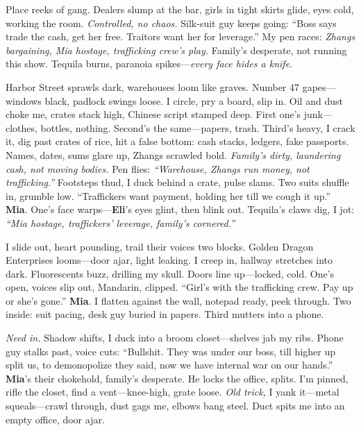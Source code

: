 \documentclass{article}
\begin{document}
Place reeks of gang. Dealers slump at the bar, girls in tight skirts glide, eyes cold, working the room. \textit{Controlled, no chaos.} Silk-suit guy keeps going: “Boss says trade the cash, get her free. Traitors want her for leverage.” My pen races: \textit{Zhangs bargaining, Mia hostage, trafficking crew’s play.} Family’s desperate, not running this show. Tequila burns, paranoia spikes—\textit{every face hides a knife.}

Harbor Street sprawls dark, warehouses loom like graves. Number 47 gapes—windows black, padlock swings loose. I circle, pry a board, slip in. Oil and dust choke me, crates stack high, Chinese script stamped deep. First one’s junk—clothes, bottles, nothing. Second’s the same—papers, trash. Third’s heavy, I crack it, dig past crates of rice, hit a false bottom: cash stacks, ledgers, fake passports. Names, dates, sums glare up, Zhangs scrawled bold. \textit{Family’s dirty, laundering cash, not moving bodies.} Pen flies: \textit{“Warehouse, Zhangs run money, not trafficking.”} Footsteps thud, I duck behind a crate, pulse slams. Two suits shuffle in, grumble low. “Traffickers want payment, holding her till we cough it up.” \textbf{Mia}. One’s face warps—\textbf{Eli}’s eyes glint, then blink out. Tequila’s claws dig, I jot: \textit{“Mia hostage, traffickers’ leverage, family’s cornered.”}

I slide out, heart pounding, trail their voices two blocks. Golden Dragon Enterprises looms—door ajar, light leaking. I creep in, hallway stretches into dark. Fluorescents buzz, drilling my skull. Doors line up—locked, cold. One’s open, voices slip out, Mandarin, clipped. “Girl’s with the trafficking crew. Pay up or she’s gone.” \textbf{Mia}. I flatten against the wall, notepad ready, peek through. Two inside: suit pacing, desk guy buried in papers. Third mutters into a phone.

\textit{Need in.} Shadow shifts, I duck into a broom closet—shelves jab my ribs. Phone guy stalks past, voice cuts: “Bullshit. They was under our boss, till higher up split us, to demonopolize they said, now we have internal war on our hands.” \textbf{Mia}’s their chokehold, family’s desperate. He locks the office, splits. I’m pinned, rifle the closet, find a vent—knee-high, grate loose. \textit{Old trick,} I yank it—metal squeals—crawl through, dust gags me, elbows bang steel. Duct spits me into an empty office, door ajar.
\end{document}
